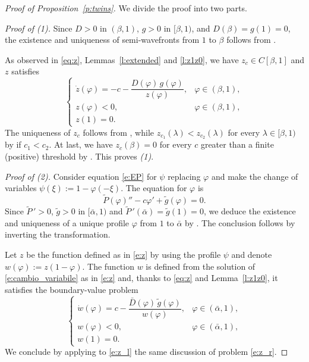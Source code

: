 \documentclass[11pt,a4paper]{article}
\renewcommand{\phi}{\varphi}
\begin{document}
\begin{proof}[Proof of Proposition~\ref{p:twins}]
We divide the proof into two parts.%

\medskip
\noindent\textit{Proof of (1).}
 Since $D > 0$ in $(\beta,1)$, $g > 0$ in $[\beta,1)$, and $D(\beta) =g(1) = 0$, the existence and uniqueness of semi-wavefronts from $1$ to $\beta$ follows from \cite[Proposition 3]{BCM2}.


As observed in \eqref{eq:z}, Lemmas~\ref{l:extended} and \ref{l:z1z0}, we have $z_c\in C[\beta, 1]$ and $z$ satisfies
\begin{equation}
\label{e:z_r}
\begin{cases}
\dot{z}(\varphi) = -c - \dfrac{D(\varphi)\,g(\varphi)}{z(\varphi)}, & \varphi \in (\beta,1), \\[4pt]
z(\varphi) < 0, & \varphi \in (\beta,1), \\[4pt]
z(1) = 0.
\end{cases}
\end{equation}
The uniqueness  of $z_c$ follows from \cite[Lemma 4.1(a)]{BCM3}, while $z_{c_1}(\lambda) < z_{c_2}(\lambda)$ for every $\lambda \in [\beta, 1)$ by \cite[Lemma 4.1(b)]{BCM3} if $c_1<c_2$. At last, we have $z_c(\beta) = 0$ for every $c$ greater than a finite (positive) threshold by \cite[Lemma 4.1(d) and Corollary 4.1]{BCM3}. This proves {\em (1)}.

\medskip
\noindent\textit{Proof of (2).}
Consider equation \eqref{e:EP} for $\psi$ replacing $\phi$ and make the change of variables \(\psi(\xi) := 1 - \varphi(-\xi)\). The equation for $\phi$ is
\begin{equation}\label{e:cambio_variabile}
\tilde{P}(\phi)''-c\phi'+\tilde{g}(\phi)=0.
\end{equation} 
Since \(\tilde{P}\,' > 0\), \(\tilde{g} > 0\) in \([\bar{\alpha},1)\) and \(\tilde{P} \,'(\bar{\alpha}) = \tilde{g}(1) = 0\), we deduce the existence and uniqueness of a unique profile $\phi$ from $1$ to  $\bar\alpha$ by \cite[Proposition 3]{BCM2}. The conclusion follows by inverting the transformation.

Let $z$ be the function defined as in \eqref{e:z} by using the profile $\psi$ and denote  $w(\phi):=z(1-\phi)$. The function $w$ is defined from the solution of \eqref{e:cambio_variabile} as in \eqref{e:z} and, thanks to \eqref{eq:z} and Lemma~\ref{l:z1z0}, it satisfies the boundary-value problem
\begin{equation}
\label{e:z_l}
\begin{cases}
\dot{w}(\varphi) = c - \dfrac{\bar{D}(\varphi)\, \tilde{g}(\varphi)}{w(\varphi)}, & \varphi \in (\bar{\alpha},1), \\%
w(\varphi) < 0, & \varphi \in (\bar{\alpha},1), \\%
w(1) = 0.
\end{cases}
\end{equation}
We conclude by applying to \eqref{e:z_l} the same discussion of problem \eqref{e:z_r}.
\end{proof}
\end{document}

